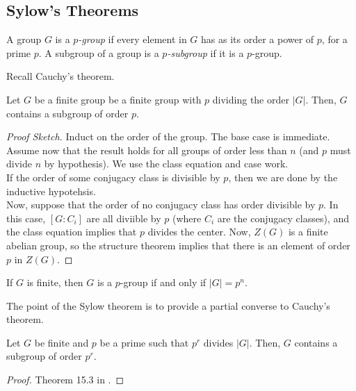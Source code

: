 \subsection{Sylow's Theorems}

\begin{df}
    A group $G$ is a \emph{$p$-group} if every element in $G$ has as its order a 
    power of $p$, for a prime $p$. A subgroup of a group is a \emph{$p$-subgroup} 
    if it is a $p$-group.
\end{df}

Recall Cauchy's theorem.

\begin{theorem}[Cauchy]
    Let $G$ be a finite group be a finite group with $p$ dividing the order $|G|$.
    Then, $G$ contains a subgroup of order $p$.
\end{theorem}
\begin{proof}[Proof Sketch]
    Induct on the order of the group. The base case is immediate. Assume now 
    that the result holds for all groups of order less than $n$ (and $p$ must divide 
    $n$ by hypothesis). We use the class equation and case work. \\

    If the order of some conjugacy class is divisible by $p$, then we are done by the 
    inductive hypotehsis. \\

    Now, suppose that the order of no conjugacy class has order divisible by $p$. 
    In this case, $[G:C_i]$ are all diviible by $p$ (where $C_i$ are the conjugacy classes),
    and the class equation implies that $p$ divides the center. Now, $Z(G)$ is a finite abelian 
    group, so the structure theorem implies that there is an element of order $p$ in $Z(G)$.
\end{proof}

\begin{corollary}
    If $G$ is finite, then $G$ is a $p$-group if and only if $|G| = p^n$.
\end{corollary}

The point of the Sylow theorem is to provide a partial converse 
to Cauchy's theorem.


\begin{theorem}[Sylow I]
    Let $G$ be finite and $p$ be a prime such that $p^r$ divides $|G|$.
    Then, $G$ contains a subgroup of order $p^r$.
\end{theorem}
\begin{proof}
    Theorem 15.3 in \cite{judson}.
\end{proof}


